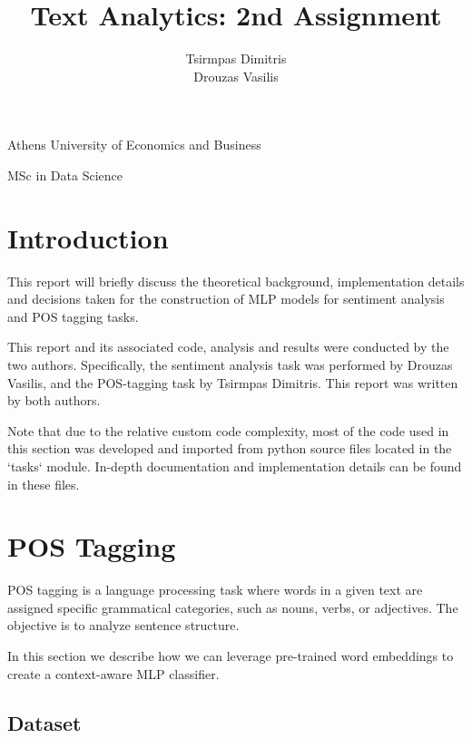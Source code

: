 \documentclass[11pt, a4paper]{article}
\title{\Huge Text Analytics: 2nd Assignment}
\author{\LARGE Tsirmpas Dimitris\\\LARGE Drouzas Vasilis}
\begin{document}
	
	\begin{titlepage}
		\maketitle
		\begin{center}
			
			\large Athens University of Economics and Business
			
			\large MSc in Data Science
			
		\end{center}
		
	\end{titlepage}
	
	\tableofcontents
	\newpage	
	
	\section{Introduction}
	
	This report will briefly discuss the theoretical background, implementation details and decisions taken for the construction of MLP models for sentiment analysis and POS tagging tasks.
	
	This report and its associated code, analysis and results were conducted by the two authors. Specifically, the sentiment analysis task was performed by Drouzas Vasilis, and the POS-tagging task by Tsirmpas Dimitris. This report was written by both authors.
		
	Note that due to the relative custom code complexity, most of the code used in this section was developed and imported from python source files located in the `tasks` module. In-depth documentation and implementation details can be found in these files. 
	
	
	\section{POS Tagging}
	
	POS tagging is a language processing task where words in a given text are assigned specific grammatical categories, such as nouns, verbs, or adjectives. The objective is to analyze sentence structure. 
	
	In this section we describe how we can leverage pre-trained word embeddings to create a context-aware MLP classifier.
	
	
	\subsection{Dataset}
	
\end{document}
